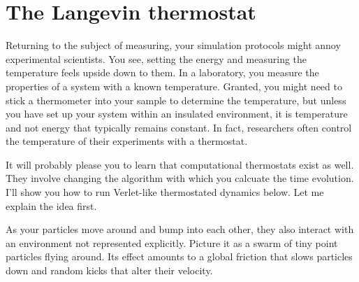 \section{The Langevin thermostat}

Returning to the subject of measuring, your simulation protocols might annoy 
experimental scientists. You see, setting the energy and measuring the 
temperature feels upside down to them. In a laboratory, you measure the 
properties of a system with a known temperature. Granted, you might need to 
stick a thermometer into your sample to determine the temperature, but unless 
you have set up your system within an insulated environment, it is temperature 
and not energy that typically remains constant. In fact, researchers often 
control the temperature of their experiments with a thermostat.

It will probably please you to learn that computational thermostats exist as 
well. They involve changing the algorithm with which you calcuate the time 
evolution. I'll show you how to run Verlet-like thermostated dynamics below. Let 
me explain the idea first.

As your particles move around and bump into each other, they also interact with 
an environment not represented explicitly. Picture it as a swarm of tiny point 
particles flying around. Its effect amounts to a global friction that slows 
particles down and random kicks that alter their velocity.

